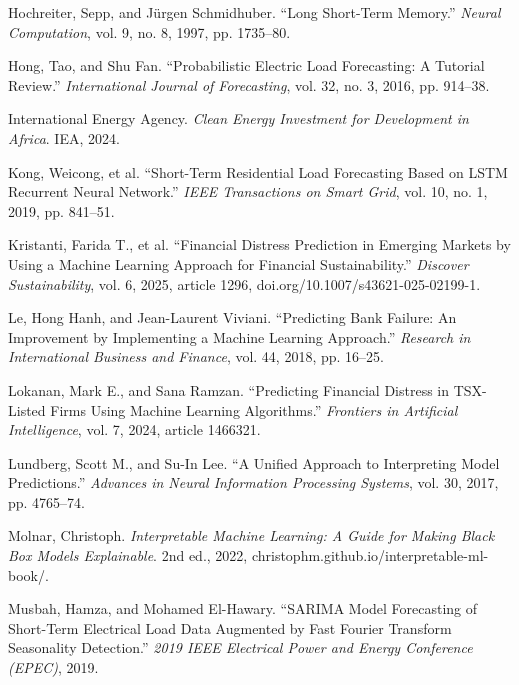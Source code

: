 \documentclass[final,1p,times]{elsarticle}
\begin{document}
\begin{list}{}{\setlength{\leftmargin}{0.5in}\setlength{\itemindent}{-0.5in}\setlength{\itemsep}{10pt}\setlength{\parsep}{0pt}}
\item Hochreiter, Sepp, and Jürgen Schmidhuber. ``Long Short-Term Memory.'' \textit{Neural Computation}, vol. 9, no. 8, 1997, pp. 1735--80.

\item Hong, Tao, and Shu Fan. ``Probabilistic Electric Load Forecasting: A Tutorial Review.'' \textit{International Journal of Forecasting}, vol. 32, no. 3, 2016, pp. 914--38.

\item International Energy Agency. \textit{Clean Energy Investment for Development in Africa}. IEA, 2024.

\item Kong, Weicong, et al. ``Short-Term Residential Load Forecasting Based on LSTM Recurrent Neural Network.'' \textit{IEEE Transactions on Smart Grid}, vol. 10, no. 1, 2019, pp. 841--51.

\item Kristanti, Farida T., et al. ``Financial Distress Prediction in Emerging Markets by Using a Machine Learning Approach for Financial Sustainability.'' \textit{Discover Sustainability}, vol. 6, 2025, article 1296, doi.org/10.1007/s43621-025-02199-1.

\item Le, Hong Hanh, and Jean-Laurent Viviani. ``Predicting Bank Failure: An Improvement by Implementing a Machine Learning Approach.'' \textit{Research in International Business and Finance}, vol. 44, 2018, pp. 16--25.

\item Lokanan, Mark E., and Sana Ramzan. ``Predicting Financial Distress in TSX-Listed Firms Using Machine Learning Algorithms.'' \textit{Frontiers in Artificial Intelligence}, vol. 7, 2024, article 1466321.

\item Lundberg, Scott M., and Su-In Lee. ``A Unified Approach to Interpreting Model Predictions.'' \textit{Advances in Neural Information Processing Systems}, vol. 30, 2017, pp. 4765--74.

\item Molnar, Christoph. \textit{Interpretable Machine Learning: A Guide for Making Black Box Models Explainable}. 2nd ed., 2022, christophm.github.io/interpretable-ml-book/.

\item Musbah, Hamza, and Mohamed El-Hawary. ``SARIMA Model Forecasting of Short-Term Electrical Load Data Augmented by Fast Fourier Transform Seasonality Detection.'' \textit{2019 IEEE Electrical Power and Energy Conference (EPEC)}, 2019.


\end{list}
\end{document}
